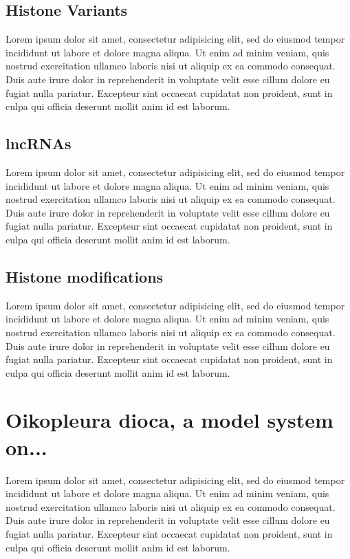 \documentclass[11pt,twoside,a4paper]{report}
\begin{document}
		\subsection{Histone Variants}
		Lorem ipsum dolor sit amet, consectetur adipisicing elit, sed do eiusmod tempor incididunt ut labore et dolore magna aliqua. Ut enim ad minim veniam, quis nostrud exercitation ullamco laboris nisi ut aliquip ex ea commodo consequat. Duis aute irure dolor in reprehenderit in voluptate velit esse cillum dolore eu fugiat nulla pariatur. Excepteur sint occaecat cupidatat non proident, sunt in culpa qui officia deserunt mollit anim id est laborum.

		\subsection{lncRNAs}
		Lorem ipsum dolor sit amet, consectetur adipisicing elit, sed do eiusmod tempor incididunt ut labore et dolore magna aliqua. Ut enim ad minim veniam, quis nostrud exercitation ullamco laboris nisi ut aliquip ex ea commodo consequat. Duis aute irure dolor in reprehenderit in voluptate velit esse cillum dolore eu fugiat nulla pariatur. Excepteur sint occaecat cupidatat non proident, sunt in culpa qui officia deserunt mollit anim id est laborum.

		\subsection{Histone modifications}
		Lorem ipsum dolor sit amet, consectetur adipisicing elit, sed do eiusmod tempor incididunt ut labore et dolore magna aliqua. Ut enim ad minim veniam, quis nostrud exercitation ullamco laboris nisi ut aliquip ex ea commodo consequat. Duis aute irure dolor in reprehenderit in voluptate velit esse cillum dolore eu fugiat nulla pariatur. Excepteur sint occaecat cupidatat non proident, sunt in culpa qui officia deserunt mollit anim id est laborum.

	\section{Oikopleura dioca, a model system on... }
	Lorem ipsum dolor sit amet, consectetur adipisicing elit, sed do eiusmod tempor incididunt ut labore et dolore magna aliqua. Ut enim ad minim veniam, quis nostrud exercitation ullamco laboris nisi ut aliquip ex ea commodo consequat. Duis aute irure dolor in reprehenderit in voluptate velit esse cillum dolore eu fugiat nulla pariatur. Excepteur sint occaecat cupidatat non proident, sunt in culpa qui officia deserunt mollit anim id est laborum.
\end{document}
